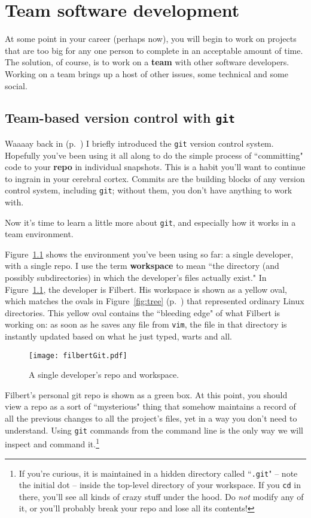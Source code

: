 
\chapter{Team software development}

At some point in your career (perhaps now), you will begin to work on projects
that are too big for any one person to complete in an acceptable amount of
time. The solution, of course, is to work on a \textbf{team} with other
software developers. Working on a team brings up a host of other issues, some
technical and some social.

\section{Team-based version control with \texttt{git}}

Waaaay back in  (p.~\pageref{introduceGit}) I briefly
introduced the \texttt{git} version control system. Hopefully you've been
using it all along to do the simple process of ``committing" code to your
\textbf{repo} in individual snapshots. This is a habit you'll want to continue
to ingrain in your cerebral cortex. Commits are the building blocks of any
version control system, including \texttt{git}; without them, you don't have
anything to work with.

Now it's time to learn a little more about \texttt{git}, and especially how it
works in a team environment.

Figure~\ref{fig:filbertGit} shows the environment you've been using so far: a
single developer, with a single repo. I use the term \textbf{workspace} to
mean ``the directory (and possibly subdirectories) in which the developer's
files actually exist." In Figure~\ref{fig:filbertGit}, the developer is
Filbert. His workspace is shown as a yellow oval, which matches the ovals in
Figure~\ref{fig:tree} (p.~\pageref{fig:tree}) that represented ordinary Linux
directories. This yellow oval contains the ``bleeding edge" of what Filbert is
working on: as soon as he saves any file from \texttt{vim}, the file in that
directory is instantly updated based on what he just typed, warts and all.

\begin{figure}[ht]
\centering
\texttt{[image: filbertGit.pdf]}
\caption{A single developer's repo and workspace.}
\label{fig:filbertGit}
\end{figure}

Filbert's personal git repo is shown as a green box. At this point, you should
view a repo as a sort of ``mysterious" thing that somehow maintains a record
of all the previous changes to all the project's files, yet in a way you don't
need to understand. Using \texttt{git} commands from the command line is the
only way we will inspect and command it.\footnote{If you're curious, it is
maintained in a hidden directory called ``\texttt{.git}" -- note the initial
dot -- inside the top-level directory of your workspace. If you \texttt{cd} in
there, you'll see all kinds of crazy stuff under the hood. Do \textit{not}
modify any of it, or you'll probably break your repo and lose all its contents!}

